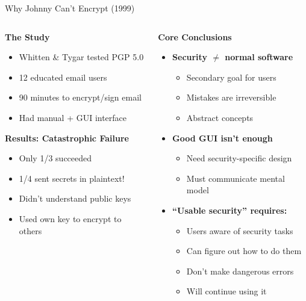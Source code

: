 \documentclass[aspectratio=169, lualatex, handout]{beamer}
\begin{document}
\begin{frame}{Why Johnny Can't Encrypt (1999)}
	\begin{columns}[T]
		\begin{column}{0.5\textwidth}
			\textbf{The Study}
			\begin{itemize}
				\item Whitten \& Tygar tested PGP 5.0
				\item 12 educated email users
				\item 90 minutes to encrypt/sign email
				\item Had manual + GUI interface
			\end{itemize}
			\textbf{Results: Catastrophic Failure}
			\begin{itemize}
				\item Only 1/3 succeeded
				\item 1/4 sent secrets in plaintext!
				\item Didn't understand public keys
				\item Used own key to encrypt to others
			\end{itemize}
		\end{column}
		\begin{column}{0.5\textwidth}
			\textbf{Core Conclusions}
			\begin{itemize}
				\item \textbf{Security $\neq$ normal software}
				      \begin{itemize}
					      \item Secondary goal for users
					      \item Mistakes are irreversible
					      \item Abstract concepts
				      \end{itemize}
				\item \textbf{Good GUI isn't enough}
				      \begin{itemize}
					      \item Need security-specific design
					      \item Must communicate mental model
				      \end{itemize}
				\item \textbf{``Usable security'' requires:}
				      \begin{itemize}
					      \item Users aware of security tasks
					      \item Can figure out how to do them
					      \item Don't make dangerous errors
					      \item Will continue using it
				      \end{itemize}
			\end{itemize}
		\end{column}
	\end{columns}
\end{frame}
\end{document}
